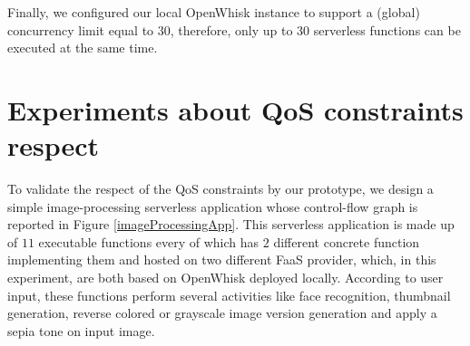 \documentclass[12pt,a4paper]{report}
\begin{document}
Finally, we configured our local OpenWhisk instance to support a (global) concurrency limit equal to $30$, therefore, only up to $30$ serverless functions can be executed at the same time.

\section{Experiments about QoS constraints respect}

To validate the respect of the QoS constraints by our prototype, we design a simple image-processing serverless application whose control-flow graph is reported in Figure \ref{imageProcessingApp}. This serverless application is made up of $11$ executable functions every of which has $2$ different concrete function implementing them and hosted on two different FaaS provider, which, in this experiment, are both based on OpenWhisk deployed locally. According to user input, these functions perform several activities like face recognition, thumbnail generation, reverse colored or grayscale image version generation and apply a sepia tone on input image.
\end{document}
